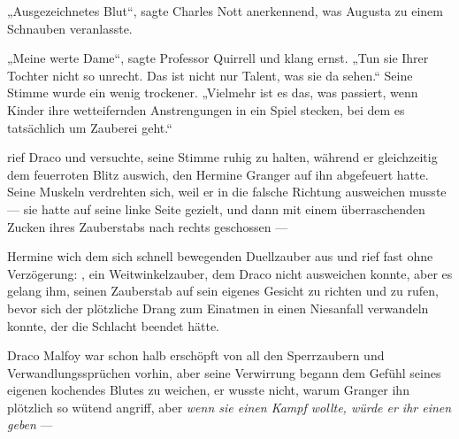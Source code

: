 „Ausgezeichnetes Blut“, sagte Charles Nott anerkennend, was Augusta zu einem Schnauben veranlasste.

„Meine werte Dame“, sagte Professor Quirrell und klang ernst.
„Tun sie Ihrer Tochter nicht so unrecht. Das ist nicht nur Talent, was sie da sehen.“ Seine Stimme wurde ein wenig trockener.
„Vielmehr ist es das, was passiert, wenn Kinder ihre wetteifernden Anstrengungen in ein Spiel stecken, bei dem es tatsächlich um Zauberei geht.“

\later

 rief Draco und versuchte, seine Stimme ruhig zu halten, während er gleichzeitig dem feuerroten Blitz auswich, den Hermine Granger auf ihn abgefeuert hatte. Seine Muskeln verdrehten sich, weil er in die falsche Richtung ausweichen musste — sie hatte auf seine linke Seite gezielt, und dann mit einem überraschenden Zucken ihres Zauberstabs nach rechts geschossen —

Hermine wich dem sich schnell bewegenden Duellzauber aus und rief fast ohne Verzögerung: , ein Weitwinkelzauber, dem Draco nicht ausweichen konnte, aber es gelang ihm, seinen Zauberstab auf sein eigenes Gesicht zu richten und  zu rufen, bevor sich der plötzliche Drang zum Einatmen in einen Niesanfall verwandeln konnte, der die Schlacht beendet hätte.

Draco Malfoy war schon halb erschöpft von all den Sperrzaubern und Verwandlungssprüchen vorhin, aber seine Verwirrung begann dem Gefühl seines eigenen kochendes Blutes zu weichen, er wusste nicht, warum Granger ihn plötzlich so wütend angriff, aber \emph{wenn sie einen Kampf wollte, würde er ihr einen geben} —

